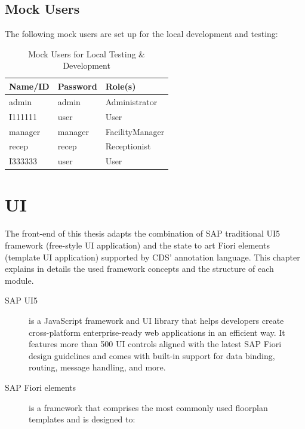 \subsection{Mock Users}

The following mock users are set up for the local development and testing:

\begin{table}[H]
    \centering
    \begin{tabular}{|m{2.5cm}|m{2.5cm}|m{3.5cm}|} \hline 
        \textbf{Name/ID} & \textbf{Password} & \textbf{Role(s)} \\ \hline 
        admin & admin & Administrator \\ \hline 
        I111111 & user & User \\ \hline 
        manager & manager & FacilityManager \\ \hline 
        recep & recep & Receptionist \\ \hline 
        I333333 & user & User \\ \hline
    \end{tabular}
    \caption{Mock Users for Local Testing \& Development}
\end{table}

\section{UI}

The front-end of this thesis adapts the combination of SAP traditional UI5 framework (free-style UI application) and the state to art Fiori elements (template UI application) supported by CDS' annotation language. This chapter explains in details the used framework concepts and the structure of each module.

\begin{description}
	\item[SAP UI5] is a JavaScript framework and UI library that helps developers create cross-platform enterprise-ready web applications in an efficient way. It features more than 500 UI controls aligned with the latest SAP Fiori design guidelines and comes with built-in support for data binding, routing, message handling, and more. \cite{fiorielements}
 
	\item[SAP Fiori elements] is a framework that comprises the most commonly used floorplan templates and is designed to:
\end{description}

